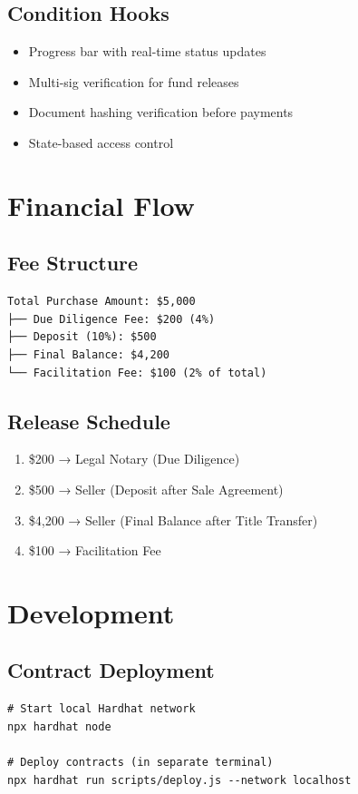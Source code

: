\documentclass[12pt,a4paper]{article}
\begin{document}
\subsection{Condition Hooks}
\begin{itemize}
\item Progress bar with real-time status updates
\item Multi-sig verification for fund releases
\item Document hashing verification before payments
\item State-based access control
\end{itemize}

\section{Financial Flow}

\subsection{Fee Structure}
\begin{verbatim}
Total Purchase Amount: $5,000
├── Due Diligence Fee: $200 (4%)
├── Deposit (10%): $500
├── Final Balance: $4,200
└── Facilitation Fee: $100 (2% of total)
\end{verbatim}

\subsection{Release Schedule}
\begin{enumerate}
\item \$200 → Legal Notary (Due Diligence)
\item \$500 → Seller (Deposit after Sale Agreement)
\item \$4,200 → Seller (Final Balance after Title Transfer)
\item \$100 → Facilitation Fee
\end{enumerate}

\section{Development}

\subsection{Contract Deployment}
\begin{verbatim}
# Start local Hardhat network
npx hardhat node

# Deploy contracts (in separate terminal)
npx hardhat run scripts/deploy.js --network localhost
\end{verbatim}
\end{document}
